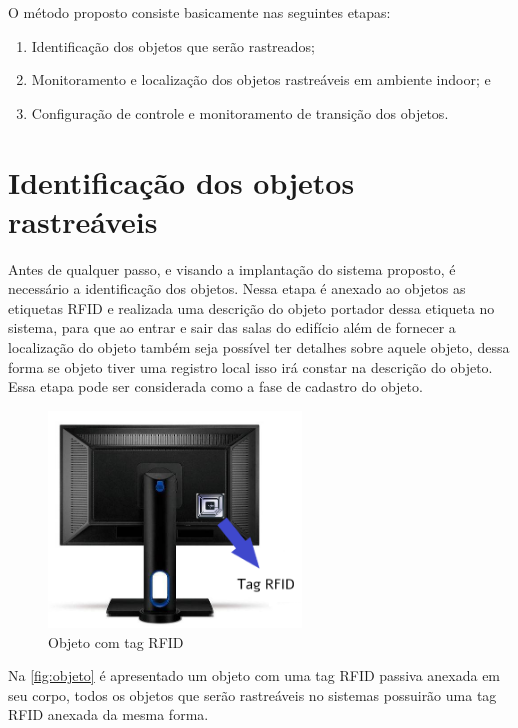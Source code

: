 \par
O método proposto consiste basicamente nas seguintes etapas:
\begin{enumerate}
    \item Identificação dos objetos que serão rastreados;
    \item Monitoramento e localização dos objetos rastreáveis em ambiente indoor; e
    \item Configuração de controle e monitoramento de transição dos objetos. 
\end{enumerate}

%
%
\section{Identificação dos objetos rastreáveis}

Antes de qualquer passo, e visando a implantação do sistema proposto, é necessário a identificação dos objetos. 
Nessa etapa é anexado ao objetos as etiquetas RFID e realizada uma descrição do objeto portador dessa etiqueta 
no sistema, para que ao entrar e sair das salas do edifício além de fornecer a localização do objeto também seja 
possível ter detalhes sobre aquele objeto, dessa forma se objeto tiver uma registro local isso irá constar na 
descrição do objeto. Essa etapa pode ser considerada como a fase de cadastro do objeto.

\begin{figure}[H]
              \caption{\label{fig:objeto}{Objeto com tag RFID}}
              \centering
              \includegraphics[width=0.6\textwidth]{Figuras/monitor.png}
\end{figure}
\par
Na \autoref{fig:objeto} é apresentado um objeto com uma tag RFID passiva anexada em seu corpo, todos os objetos que serão rastreáveis no sistemas possuirão uma tag RFID anexada da mesma forma.
